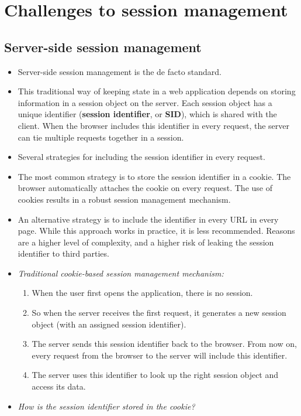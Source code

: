 \documentclass[../main.tex]{subfiles}
\begin{document}
\section{Challenges to session management}
\subsection{Server-side session management}
\begin{itemize}
\item Server-side session management is the de facto standard.
\item This traditional way of keeping state in a web application depends on storing information in a session object on the server. Each session object has a unique identifier (\textbf{session identifier}, or \textbf{SID}), which is shared with the client. When the browser includes this identifier in every request, the server can tie multiple requests together in a session.
\item Several strategies for including the session identifier in every request.
\item The most common strategy is to store the session identifier in a cookie. The browser automatically attaches the cookie on every request. The use of cookies results in a robust session management mechanism.
\item An alternative strategy is to include the identifier in every URL in every page. While this approach works in practice, it is less recommended. Reasons are a higher level of complexity, and a higher risk of leaking the session identifier to third parties.
\item \emph{Traditional cookie-based session management mechanism:}
\begin{enumerate}
\item When the user first opens the application, there is no session.
\item So when the server receives the first request, it generates a new session object (with an assigned session identifier).
\item The server sends this session identifier back to the browser. From now on, every request from the browser to the server will include this identifier.
\item The server uses this identifier to look up the right session object and access its data.
\end{enumerate}
\item \emph{How is the session identifier stored in the cookie?}
\begin{enumerate}

\end{enumerate}
\end{itemize}
\end{document}
